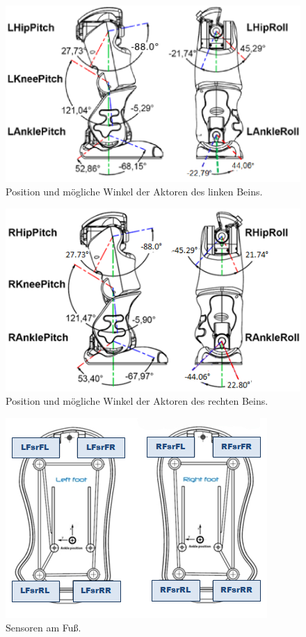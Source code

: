 \begin{figure}[htb]
	\centering
	\includegraphics[width=0.7\linewidth]{Bilder/hardware_llegjoint.png}
	\caption{Position und mögliche Winkel der Aktoren des linken Beins. \cite[in /kinematics-data/joints]{nao_docu_dev_guide}}
	\label{hardware_llegjoint}
\end{figure}
\begin{figure}[htb]
	\centering
	\includegraphics[width=0.7\linewidth]{Bilder/hardware_rlegjoint.png}
	\caption{Position und mögliche Winkel der Aktoren des rechten Beins. \cite[in /kinematics-data/joints]{nao_docu_dev_guide}}
	\label{hardware_rlegjoint}
\end{figure}

\begin{figure}[htb]
	\centering
	\includegraphics[width=0.6\linewidth]{Bilder/hardware_semelles.png}
	\caption{Sensoren am Fuß. %
	}
	\label{hardware_semelles}
\end{figure}

